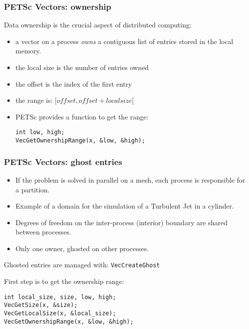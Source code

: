 \begin{frame}[fragile]
  \frametitle{PETSc Vectors: ownership}

Data ownership is the crucial aspect of distributed computing:
\begin{itemize}
\item a vector on a process \textit{owns} a contiguous list of entries stored in the local memory.
\item the local size is the number of entries owned
\item the offset is the index of the first entry
\item the range is: $[offset, offset + local size [$
\item PETSc provides a function to get the range:
\begin{lstlisting}[style=c]
int low, high;
VecGetOwnershipRange(x, &low, &high);
\end{lstlisting}
\end{itemize}

\end{frame}

\begin{frame}[fragile]
  \frametitle{PETSc Vectors: ghost entries}

\begin{itemize}
\item If the problem is solved in parallel on a mesh, each process is responsible for a partition.
\item Example of a domain for the simulation of a Turbulent Jet in a cylinder.
\item Degrees of freedom on the inter-process (interior) boundary are shared between processes.
\item Only one owner, ghosted on other processes. 
\end{itemize}

\medskip
Ghosted entries are managed with: \texttt{VecCreateGhost}

\medskip
First step is to get the ownership range:
\begin{lstlisting}[style=c]
int local_size, size, low, high;
VecGetSize(x, &size);
VecGetLocalSize(x, &local_size);
VecGetOwnershipRange(x, &low, &high);
\end{lstlisting}

\end{frame}

